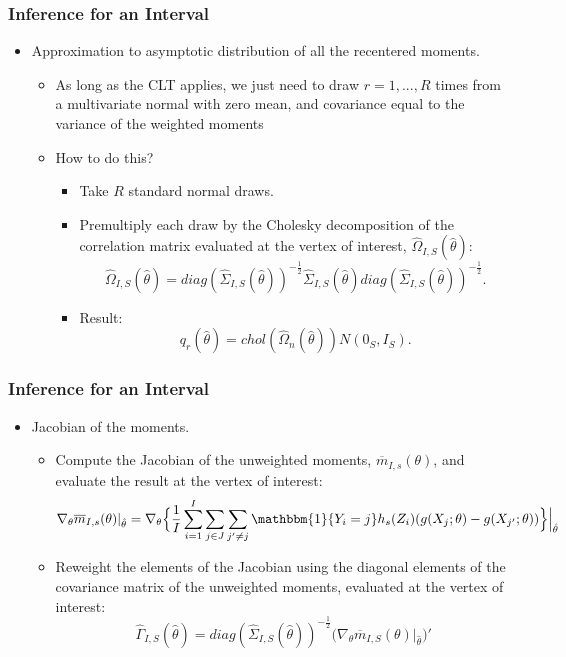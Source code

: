 \begin{frame}
\frametitle{Inference for an Interval}

\begin{itemize}
	\item Approximation to asymptotic distribution of all the recentered moments.
	\begin{itemize}
		\item As long as the CLT applies, we just need to draw $r=1,...,R$ times from a multivariate normal with zero mean, and
	covariance equal to the variance of the weighted moments
		\item How to do this?
		\begin{itemize}
			\item Take $R$ standard normal draws.
			\item Premultiply each draw by the Cholesky decomposition of the correlation matrix evaluated at the vertex of interest, $\widehat{\Omega}_{I,S}(\hat{\theta})$:
			\begin{equation*}
			\widehat{\Omega }_{I,S}(\hat{\theta})=diag(\widehat{\Sigma}_{I,S}(\hat{\theta}))^{-\frac{1}{2}}\widehat{\Sigma}_{I,S}(\hat{\theta})diag(\widehat{\Sigma}_{I,S}(\hat{\theta}))^{-\frac{1}{2}}.
			\end{equation*}
			\item Result: 
			\begin{equation*}
			q_{r}(\hat{\theta})=chol(\widehat{\Omega}_{n}(\hat{\theta}))N(0_{S},I_{S}).
			\end{equation*}
		\end{itemize}
	\end{itemize}
\end{itemize}
\end{frame}
\begin{frame}
\frametitle{Inference for an Interval}

\begin{itemize}
	\item Jacobian of the moments.
	\begin{itemize}
		\item Compute the Jacobian of the unweighted moments, $\overline{m}_{I,s}(\theta)$, and evaluate the result at the vertex of interest:
		\begin{equation*}
		\nabla_{\theta}\overline{m}_{I,s}(\theta)|_{\hat{\theta}}=\nabla_{\theta}\Big\{\frac{1}{I}\sum_{i=1}^{I}\sum_{j\in J}\sum_{j'\neq j}\mathbbm{1}\{Y_{i}=j\}h_{s}(Z_{i})(g(X_{j};\theta)-g(X_{j'};\theta))\Big\}\Big|_{\hat{\theta}}
		\end{equation*}
		\item Reweight the elements of the Jacobian using the diagonal elements of the covariance matrix of the unweighted moments, evaluated at the vertex of interest:
		\begin{equation*}
		\widehat{\Gamma}_{I,S}(\hat{\theta})=diag(\widehat{\Sigma}_{I,S}(\hat{\theta}))^{-\frac{1}{2}}\Big(\nabla_{\theta}\overline{m}_{I,S}(\theta)|_{\hat{\theta}}\Big)'
		\end{equation*}
	\end{itemize}
\end{itemize}
\end{frame}
